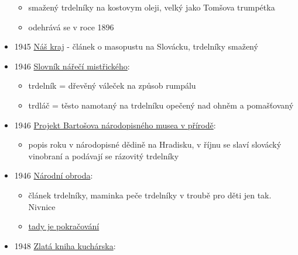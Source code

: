 \begin{itemize}
  \begin{itemize}
  \tightlist
  \item
    smažený trdelníky na kostovym oleji, velký jako Tomšova trumpétka
  \item
    odehrává se v roce 1896
  \end{itemize}
\item
  1945
  \href{https://ceskadigitalniknihovna.cz/view/uuid:418433d0-7277-11dc-b60a-000d606f5dc6?page=uuid\%3Ad7f9cd6a-a3fe-4479-9f34-63429f6ac6d1&fulltext=trdeln\%C3\%ADk\%20OR\%20trdeln\%C3\%ADky\%20OR\%20trdeln\%C3\%ADk\%C5\%AF&source=nkp}{Náš
  kraj} - článek o masopustu na Slovácku, trdelníky smažený
\item
  1946
  \href{https://ceskadigitalniknihovna.cz/view/uuid:e0e42f00-3284-11e4-8f64-005056827e52?page=uuid\%3A6ed8c580-46e6-11e4-a450-5ef3fc9bb22f&fulltext=trdeln\%C3\%ADk\%20OR\%20trdeln\%C3\%ADky\%20OR\%20trdeln\%C3\%ADk\%C5\%AF&source=nkp}{Slovník
  nářečí mistřického}:

  \begin{itemize}
  \tightlist
  \item
    trdelník = dřevěný váleček na způsob rumpálu
  \item
    trdláč = těsto namotaný na trdelníku opečený nad ohněm a pomašťovaný
  \end{itemize}
\item
  1946
  \href{https://ceskadigitalniknihovna.cz/uuid/uuid:c22c5a5d-8140-11ed-b210-001b63bd97ba}{Projekt
  Bartošova národopisného musea v přírodě}:

  \begin{itemize}
  \tightlist
  \item
    popis roku v národopisné dědině na Hradisku, v říjnu se slaví
    slovácký vinobraní a podávají se rázovitý trdelníky
  \end{itemize}
\item
  1946
  \href{https://ceskadigitalniknihovna.cz/uuid/uuid:4b7ffab0-68c3-11e8-a583-005056827e51}{Národní
  obroda}:

  \begin{itemize}
  \tightlist
  \item
    článek trdelníky, maminka peče trdelníky v troubě pro děti jen tak.
    Nivnice
  \item
    \href{https://ceskadigitalniknihovna.cz/uuid/uuid:747b7700-68c3-11e8-943b-5ef3fc9ae867}{tady
    je pokračování}
  \end{itemize}
\item
  1948
  \href{https://dikda.snk.sk/uuid/uuid:92a95dfe-83fe-44e4-9c0a-5c7cec70c80c}{Zlatá
  kniha kuchárska}:


\end{itemize}
